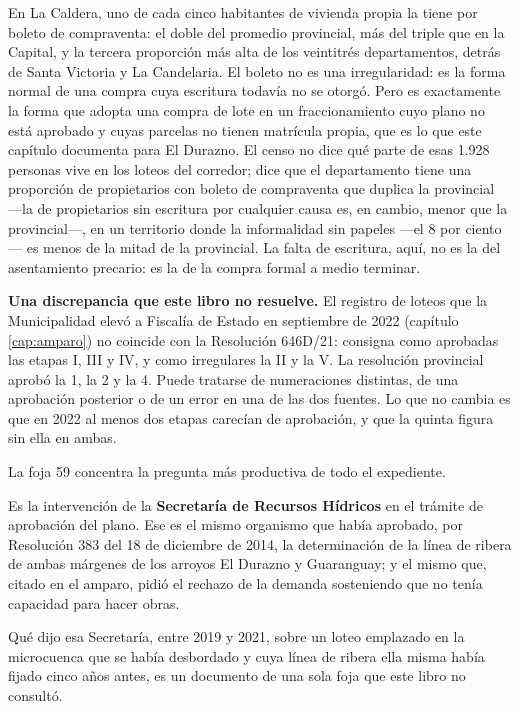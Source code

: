 \begin{cautela}
En La Caldera, uno de cada cinco habitantes de vivienda propia la tiene por boleto de compraventa: el doble del promedio provincial, más del triple que en la Capital, y la tercera proporción más alta de los veintitrés departamentos, detrás de Santa Victoria y La Candelaria. El boleto no es una irregularidad: es la forma normal de una compra cuya escritura todavía no se otorgó. Pero es exactamente la forma que adopta una compra de lote en un fraccionamiento cuyo plano no está aprobado y cuyas parcelas no tienen matrícula propia, que es lo que este capítulo documenta para El Durazno. El censo no dice qué parte de esas 1.928 personas vive en los loteos del corredor; dice que el departamento tiene una proporción de propietarios con boleto de compraventa que duplica la provincial ---la de propietarios sin escritura por cualquier causa es, en cambio, menor que la provincial---, en un territorio donde la informalidad sin papeles ---el 8 por ciento--- es menos de la mitad de la provincial. La falta de escritura, aquí, no es la del asentamiento precario: es la de la compra formal a medio terminar.
\end{cautela}

\begin{cautela}
\textbf{Una discrepancia que este libro no resuelve.} El registro de loteos que la Municipalidad elevó a Fiscalía de Estado en septiembre de 2022 (capítulo \ref{cap:amparo}) no coincide con la Resolución 646D/21: consigna como aprobadas las etapas I, III y IV, y como irregulares la II y la V. La resolución provincial aprobó la 1, la 2 y la 4. Puede tratarse de numeraciones distintas, de una aprobación posterior o de un error en una de las dos fuentes. Lo que no cambia es que en 2022 al menos dos etapas carecían de aprobación, y que la quinta figura sin ella en ambas.
\end{cautela}

\begin{cautela}
La foja 59 concentra la pregunta más productiva de todo el expediente.

Es la intervención de la \textbf{Secretaría de Recursos Hídricos} en el trámite de aprobación del plano. Ese es el mismo organismo que había aprobado, por Resolución 383 del 18 de diciembre de 2014, la determinación de la línea de ribera de ambas márgenes de los arroyos El Durazno y Guaranguay; y el mismo que, citado en el amparo, pidió el rechazo de la demanda sosteniendo que no tenía capacidad para hacer obras.

Qué dijo esa Secretaría, entre 2019 y 2021, sobre un loteo emplazado en la microcuenca que se había desbordado y cuya línea de ribera ella misma había fijado cinco años antes, es un documento de una sola foja que este libro no consultó.
\end{cautela}

